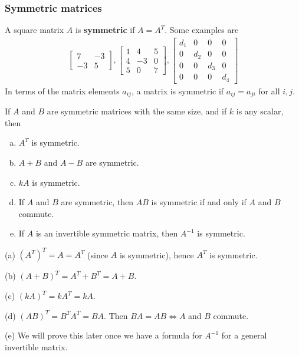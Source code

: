 \documentclass[12pt,letterpaper,reqno]{article}
\numberwithin{equation}{section}
\newcommand{\fixme}[1]{{\color{orange}{[#1]}}}
\begin{document}
\subsubsection{Symmetric matrices}
A square matrix $A$ is {\bf symmetric} if $A=A^T$. Some examples are
\begin{align*}
	\begin{bmatrix}
		7 & -3 \\ -3 & 5
	\end{bmatrix}, \begin{bmatrix}
		1 & 4 & 5 \\ 4 & -3 & 0 \\ 5 & 0 & 7
	\end{bmatrix}, \begin{bmatrix}
		d_1 & 0 & 0 & 0 \\ 0 & d_2 & 0 & 0 \\ 0 & 0 & d_3 & 0 \\ 0 & 0 & 0 & d_4
	\end{bmatrix}
\end{align*}
In terms of the matrix elements $a_{ij}$, a matrix is symmetric if $a_{ij}=a_{ji}$ for all $i,j$.
 
\begin{thm}
		If $A$ and $B$ are symmetric matrices with the same size, and if $k$ is any scalar, then
\begin{enumerate}[(a)] 
	\item $A^T$ is symmetric.
	\item $A+B$ and $A-B$ are symmetric.
	\item $kA$ is symmetric.
	\item If $A$ and $B$ are symmetric, then $AB$ is symmetric if and only if $A$ and $B$ commute.
	\item If $A$ is an invertible symmetric matrix, then $A^{-1}$ is symmetric.
\end{enumerate}
\end{thm}

\begin{pf}
(a) $(A^T)^T=A=A^T$ (since $A$ is symmetric), hence $A^T$ is symmetric. 

(b) $(A+B)^T=A^T+B^T=A+B$.

(c) $(kA)^T=kA^T=kA$. 

(d) $(AB)^T=B^TA^T=BA$. Then $BA=AB \iff A$ and $B$ commute. 

(e) We will prove this later once we have a formula for $A^{-1}$ for a general invertible matrix.	\fixme{Introduce Cramer's rule before this?}
\end{pf}
\end{document}
